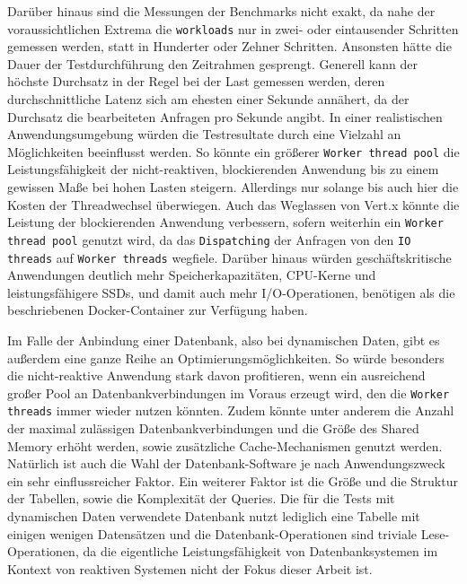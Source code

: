 Darüber hinaus sind die Messungen der Benchmarks nicht exakt, da nahe der voraussichtlichen Extrema die \verb|workloads|
nur in zwei- oder eintausender Schritten gemessen werden, statt in Hunderter oder Zehner Schritten.
Ansonsten hätte die Dauer der Testdurchführung den Zeitrahmen gesprengt.
Generell kann der höchste Durchsatz in der Regel bei der Last gemessen werden, deren durchschnittliche Latenz sich am ehesten
einer Sekunde annähert, da der Durchsatz die bearbeiteten Anfragen pro Sekunde angibt.
\newline\newline
In einer realistischen Anwendungsumgebung würden die Testresultate durch eine Vielzahl an Möglichkeiten beeinflusst werden.
So könnte ein größerer \verb|Worker thread pool| die Leistungsfähigkeit der nicht-reaktiven, blockierenden
Anwendung bis zu einem gewissen Maße bei hohen Lasten steigern. Allerdings nur solange bis auch hier die Kosten der Threadwechsel
überwiegen. Auch das Weglassen von Vert.x könnte die Leistung der blockierenden Anwendung verbessern, sofern weiterhin
ein \verb|Worker thread pool| genutzt wird, da das \verb|Dispatching| der Anfragen von den \verb|IO threads| auf
\verb|Worker threads| wegfiele. Darüber hinaus würden geschäftskritische Anwendungen deutlich mehr Speicherkapazitäten, CPU-Kerne und
leistungsfähigere SSDs, und damit auch mehr I/O-Operationen, benötigen als die beschriebenen Docker-Container zur Verfügung haben.

Im Falle der Anbindung einer Datenbank, also bei dynamischen Daten, gibt es außerdem eine ganze Reihe an Optimierungsmöglichkeiten.
So würde besonders die nicht-reaktive Anwendung stark davon profitieren, wenn ein ausreichend großer Pool an Datenbankverbindungen
im Voraus erzeugt wird, den die \verb|Worker threads| immer wieder nutzen könnten.
Zudem könnte unter anderem die Anzahl der maximal zulässigen
Datenbankverbindungen und die Größe des Shared Memory erhöht werden, sowie zusätzliche Cache-Mechanismen genutzt werden.
Natürlich ist auch die Wahl der Datenbank-Software je nach Anwendungszweck ein sehr einflussreicher Faktor.
\newline\newline
Ein weiterer Faktor ist die Größe und die Struktur der Tabellen, sowie die Komplexität der Queries.
Die für die Tests mit dynamischen Daten verwendete Datenbank nutzt lediglich eine Tabelle mit einigen wenigen Datensätzen und die
Datenbank-Operationen sind triviale Lese-Operationen,
da die eigentliche Leistungsfähigkeit von Datenbanksystemen im Kontext von reaktiven Systemen nicht der Fokus dieser Arbeit ist.

